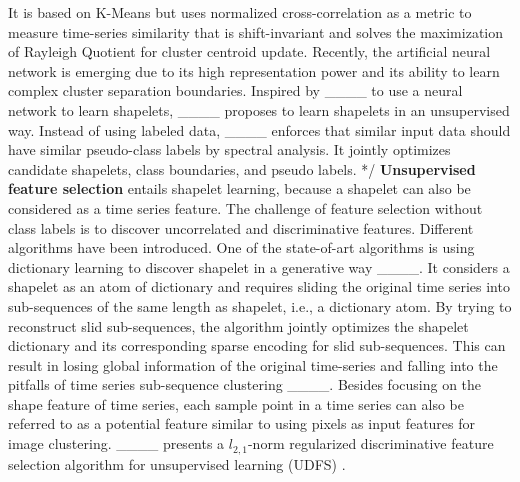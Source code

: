 It is based on K-Means but uses normalized cross-correlation as a metric to measure time-series similarity that is shift-invariant and solves the maximization of Rayleigh Quotient for cluster centroid update. 
Recently, the artificial neural network is emerging due to its high representation power and its ability to learn complex cluster separation boundaries.
Inspired by ____ to use a neural network to learn shapelets, ____ proposes to learn shapelets in an unsupervised way. Instead of using labeled data, ____ enforces that similar input data should have similar pseudo-class labels by spectral analysis. It jointly optimizes candidate shapelets, class boundaries, and pseudo labels. %
*/
\textbf{Unsupervised feature selection} entails shapelet learning, because a shapelet can also be considered as a time series feature. The challenge of feature selection without class labels is to discover uncorrelated and discriminative features. Different algorithms have been introduced. One of the state-of-art algorithms is using dictionary learning to discover shapelet in a generative way ____. It considers a shapelet as an atom of dictionary and requires sliding the original time series into sub-sequences of the same length as shapelet, i.e., a dictionary atom. By trying to reconstruct slid sub-sequences, the algorithm jointly optimizes the shapelet dictionary and its corresponding sparse encoding for slid sub-sequences. This can result in losing global information of the original time-series and falling into the pitfalls of time series sub-sequence clustering ____. Besides focusing on the shape feature of time series, each sample point in a time series can also be referred to as a potential feature similar to using pixels as input features for image clustering. ____ presents a $l_{2,1}$-norm regularized discriminative feature selection  algorithm for unsupervised learning (UDFS) . 
